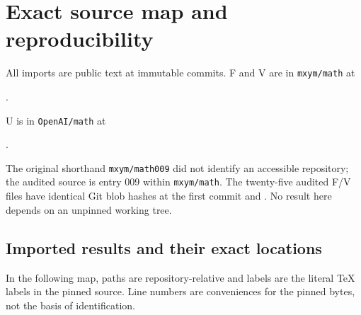 \section{Exact source map and reproducibility}\label{sec:sources}
All imports are public text at immutable commits. F and V are in
\texttt{mxym/math} at
\begin{center}\small\texttt{\srcpin}.\end{center}
U is in \texttt{OpenAI/math} at
\begin{center}\small\texttt{\uppin}.\end{center}
The original shorthand \texttt{mxym/math009} did not identify an accessible
repository; the audited source is entry 009 within \texttt{mxym/math}.
The twenty-five audited F/V files have identical Git blob hashes at the
first commit and .
No result here depends on an unpinned working tree.

\subsection{Imported results and their exact locations}
In the following map, paths are repository-relative and labels are the
literal TeX labels in the pinned source. Line numbers are conveniences for
the pinned bytes, not the basis of identification.

